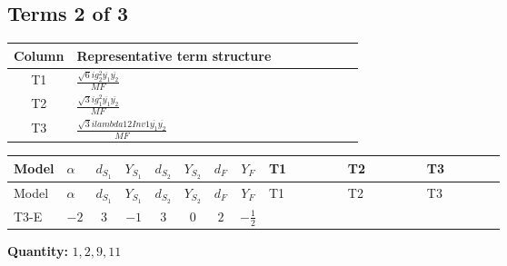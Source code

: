 \documentclass[8pt]{article}
\begin{document}
\begin{landscape}
\subsection*{Terms 2 of 3}
\begin{center}
\begin{tabular}{@{}c >{\raggedright\arraybackslash}p{0.82\linewidth}@{}}
\toprule
Column & Representative term structure \\
\midrule
T1 & \(\displaystyle \frac{\sqrt{6} i g_{2}^{2} \overline{y_{1}} \overline{y_{2}}}{MF}\) \\
\midrule
T2 & \(\displaystyle \frac{\sqrt{3} i g_{1}^{2} \overline{y_{1}} \overline{y_{2}}}{MF}\) \\
\midrule
T3 & \(\displaystyle \frac{\sqrt{3} i lambda12Inv1 \overline{y_{1}} \overline{y_{2}}}{MF}\) \\
\midrule
\bottomrule
\end{tabular}
\end{center}
\smallskip
\tiny
\begin{longtable}{@{}llcccccc >{\raggedright\arraybackslash}p{0.21\linewidth} >{\raggedright\arraybackslash}p{0.21\linewidth} >{\raggedright\arraybackslash}p{0.21\linewidth}@{}}
\toprule
Model & $\alpha$ & $d_{S_1}$ & $Y_{S_1}$ & $d_{S_2}$ & $Y_{S_2}$ & $d_F$ & $Y_F$ & T1 & T2 & T3 \\
\midrule
\endfirsthead
\toprule
Model & $\alpha$ & $d_{S_1}$ & $Y_{S_1}$ & $d_{S_2}$ & $Y_{S_2}$ & $d_F$ & $Y_F$ & T1 & T2 & T3 \\
\midrule
\endhead
T3-E & $-2$ & $3$ & $-1$ & $3$ & $0$ & $2$ & $-\frac{1}{2}$ & \scriptsize\adjustbox{max width=\linewidth}{$\begin{gathered} - \frac{\sqrt{6} i g_{2}^{2} \overline{y_{1}} \overline{y_{2}}}{6 MF}\end{gathered}$} & \scriptsize\adjustbox{max width=\linewidth}{$\begin{gathered} - \frac{\sqrt{3} i g_{1}^{2} \overline{y_{1}} \overline{y_{2}}}{8 MF}\end{gathered}$} & \scriptsize\adjustbox{max width=\linewidth}{$\begin{gathered} \frac{\sqrt{3} i lambda12Inv1 \overline{y_{1}} \overline{y_{2}}}{6 MF}\end{gathered}$} \\
\midrule
\bottomrule
\end{longtable}
\clearpage
\noindent\textbf{Quantity: }$\mathrm{1,2,9,11}$\par\smallskip

\end{landscape}
\end{document}
